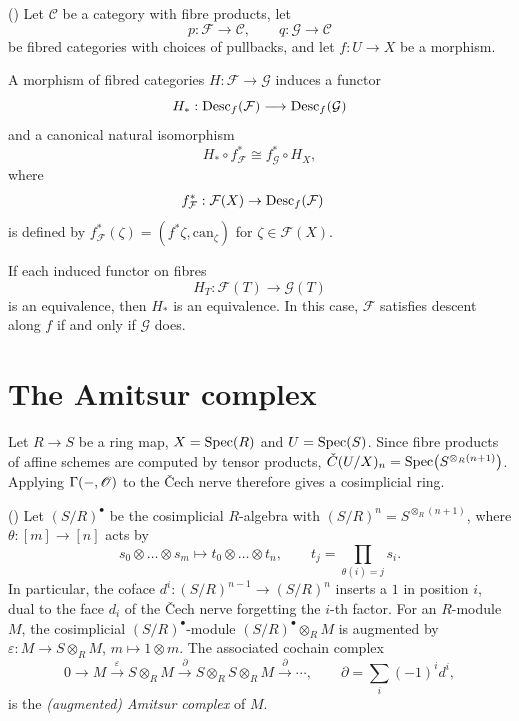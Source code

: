 \begin{lemma}
	\label{lem:desc-pseudonatural}
	(\cite[][Vistoli, §4.1.4, Prop. 4.12.]{vistoli2007notes})
	Let $\mathcal{C}$ be a category with fibre products,
	let
	\[
	p:\mathcal{F}\to\mathcal{C},
	\qquad
	q:\mathcal{G}\to\mathcal{C}
	\]
	be fibred categories with choices of pullbacks,
	and let $f:U\to X$ be a morphism.
	
	A morphism of fibred categories
	$H:\mathcal{F}\to\mathcal{G}$
	induces a functor
	\[
	H_*:\operatorname{Desc}_f(\mathcal{F})
	\longrightarrow\operatorname{Desc}_f(\mathcal{G})
	\]
	and a canonical natural isomorphism
	\[
	H_*\circ f_{\mathcal{F}}^*
	\cong
	f_{\mathcal{G}}^*\circ H_X,
	\]
	where 
	\begin{align*}
			f_\mathcal{F}^*: \mathcal{F}(X) &\to \operatorname{Desc}_f(\mathcal{F})
	\end{align*}
	is defined by $f^*_\mathcal{F}(\zeta) = (f^*\zeta, \mathrm{can}_\zeta)$ for $\zeta \in \mathcal{F}(X)$.
	
	If each induced functor on fibres
	\[
	H_T:\mathcal{F}(T)\longrightarrow\mathcal{G}(T)
	\]
	is an equivalence, then $H_*$ is an equivalence.
	In this case, $\mathcal{F}$ satisfies descent
	along $f$ if and only if $\mathcal{G}$ does.
		
\end{lemma}


\section{The Amitsur complex}

Let $R\to S$ be a ring map, $X=\operatorname{Spec}\!\left(R\right)$ and $U=\operatorname{Spec}\!\left(S\right)$. Since fibre products of affine schemes are computed by tensor products, $\check{C}(U/X)_n=\operatorname{Spec}\!\left(S^{\otimes_R(n+1)}\right)$. Applying $\Gamma(-,\mathscr{O})$ to the \v{C}ech nerve therefore gives a cosimplicial ring.

\begin{definition}\label{def:amitsur}
	(\cite[][Section~023F]{stacks-project})
	Let $(S/R)^\bullet$ be the cosimplicial $R$-algebra with $(S/R)^n=S^{\otimes_R(n+1)}$, where $\theta:[m]\to[n]$ acts by
	\[
	s_0\otimes\dots\otimes s_m\longmapsto t_0\otimes\dots\otimes t_n,\qquad t_j=\prod_{\theta(i)=j}s_i .
	\]
	In particular, the coface $d^i:(S/R)^{n-1}\to(S/R)^n$ inserts a $1$ in position $i$, dual to the face $d_i$ of the \v{C}ech nerve forgetting the $i$-th factor. For an $R$-module $M$, the cosimplicial $(S/R)^\bullet$-module $(S/R)^\bullet\otimes_RM$ is augmented by $\varepsilon:M\to S\otimes_RM$, $m\mapsto1\otimes m$. The associated cochain complex
	\[
	0\to M\xrightarrow{\ \varepsilon\ }S\otimes_RM\xrightarrow{\ \partial\ }S\otimes_RS\otimes_RM\xrightarrow{\ \partial\ }\cdots,\qquad\partial=\sum_{i}(-1)^id^i,
	\]
	is the \emph{(augmented) Amitsur complex} of $M$.
\end{definition}

